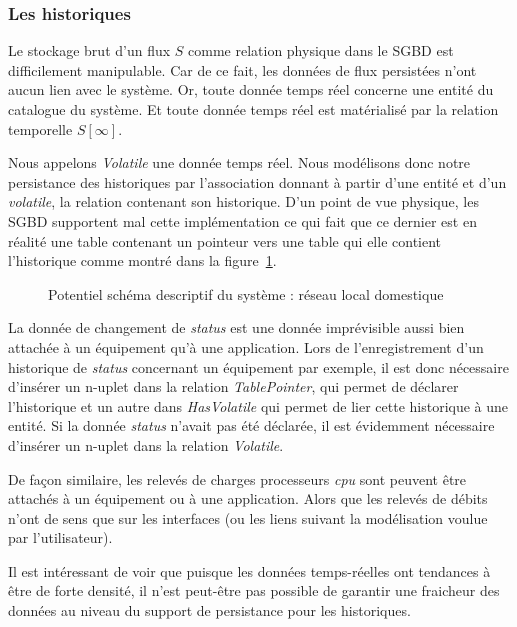 \subsubsection{Les historiques}
Le stockage brut d'un flux $S$ comme relation physique dans le SGBD est difficilement manipulable. Car de ce fait, les données de flux persistées n'ont aucun lien avec le système. Or, toute donnée temps réel concerne une entité du catalogue du système. Et toute donnée temps réel est matérialisé par la relation temporelle $S[\infty]$.

Nous appelons \textit{Volatile} une donnée temps réel. Nous modélisons donc notre persistance des historiques par l'association donnant à partir d'une entité et d'un \textit{volatile}, la relation contenant son historique. D'un point de vue physique, les SGBD supportent mal cette implémentation ce qui fait que ce dernier est en réalité une table contenant un pointeur vers une table qui elle contient l'historique comme montré dans la figure~\ref{fig:contrib:asteroid:theorie:volatile}.


	\begin{figure}[ht]
		\caption{Potentiel schéma descriptif du système : réseau local domestique}\label{fig:contrib:asteroid:theorie:volatile}
	\end{figure}

\begin{example}
	La donnée de changement de \textit{status} est une donnée imprévisible aussi bien attachée à un équipement qu'à une application. Lors de l'enregistrement d'un historique de \textit{status} concernant un équipement par exemple, il est donc nécessaire d'insérer un n-uplet dans la relation \textit{TablePointer}, qui permet de déclarer l'historique et un autre dans \textit{HasVolatile} qui permet de lier cette historique à une entité. Si la donnée \textit{status} n'avait pas été déclarée, il est évidemment nécessaire d'insérer un n-uplet dans la relation \textit{Volatile}.
	
	De façon similaire, les relevés de charges processeurs \textit{cpu} sont peuvent être attachés à un équipement ou à une application. Alors que les relevés de débits n'ont de sens que sur les interfaces (ou les liens suivant la modélisation voulue par l'utilisateur).
\end{example}

Il est intéressant de voir que puisque les données temps-réelles ont tendances à être de forte densité, il n'est peut-être pas possible de garantir une fraicheur des données au niveau du support de persistance pour les historiques.

